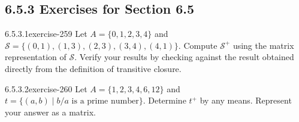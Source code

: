 \documentclass[twoside,10pt,]{book}
\numberwithin{equation}{section}
\begin{document}
\subsection*{6.5.3 Exercises for Section 6.5}
\begin{divisionsolution}{6.5.3.1}{}{exercise-259}%
\hypertarget{p-2210}{}%
Let \(A =\{0, 1, 2, 3, 4\}\) and \(\mathcal{S}=\{(0, 1), (1, 3), (2, 3), (3, 4), (4, 1)\}\). Compute \(\mathcal{S}^+\) using the matrix representation of \(\mathcal{S}\). Verify your results by checking against the result obtained directly from the definition of transitive closure.%
\end{divisionsolution}%
\begin{divisionsolution}{6.5.3.2}{}{exercise-260}%
\hypertarget{p-2211}{}%
Let \(A=\{1,2,3,4,6,12\}\) and \(t=\{(a,b)\mid b/a \textrm{ is a prime number}\}\). Determine \(t^+\) by any means.  Represent your answer as a matrix.%
\end{divisionsolution}%
\end{document}

